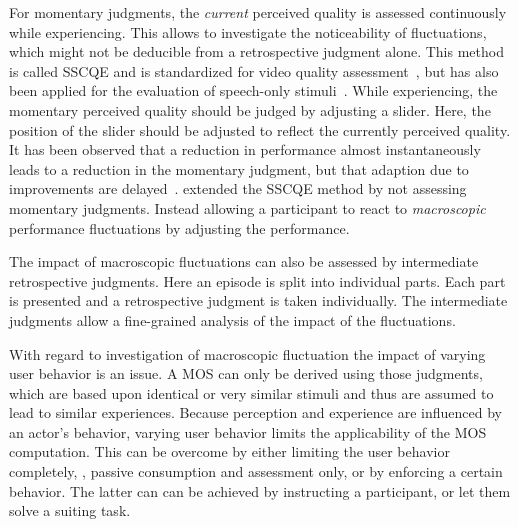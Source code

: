 For momentary judgments, the \emph{current} perceived quality is assessed continuously while experiencing.
This allows to investigate the noticeability of fluctuations, which might not be deducible from a retrospective judgment alone.
This method is called \ac{SSCQE} and is standardized for video quality assessment~\citep[][]{itu-r_recommendation_bt.500-13_methodology_2012}, but has also been applied for the evaluation of speech-only stimuli~\cite[\eg,][]{gros_instantaneous_2001}.
While experiencing, the momentary perceived quality should be judged by adjusting a slider.
Here, the position of the slider should be adjusted to reflect the currently perceived quality.
It has been observed that a reduction in performance almost instantaneously leads to a reduction in the momentary judgment, but that adaption due to improvements are delayed~\citep[\eg,][]{hands_recency_2001, gros_instantaneous_2001, hamberg_time-varying_1999}.
\citet{borowiak_long_2013} extended the \ac{SSCQE} method by not assessing momentary judgments.
Instead allowing a participant to react to \emph{macroscopic} performance fluctuations by adjusting the performance.

The impact of macroscopic fluctuations can also be assessed by intermediate retrospective judgments.
Here an episode is split into individual parts.
Each part is presented and a retrospective judgment is taken individually.
The intermediate judgments allow a fine-grained analysis of the impact of the fluctuations.

With regard to investigation of macroscopic fluctuation the impact of varying user behavior is an issue.
A \ac{MOS} can only be derived using those judgments, which are based upon identical or very similar stimuli and thus are assumed to lead to similar experiences.
Because perception and experience are influenced by an actor's behavior, varying user behavior limits the applicability of the \ac{MOS} computation.
This can be overcome by either limiting the user behavior completely, \ie, passive consumption and assessment only, or by enforcing a certain behavior.
The latter can can be achieved by instructing a participant, or let them solve a suiting task.


